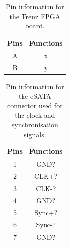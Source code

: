 \documentclass[a4paper]{article}
\begin{document}
\begin{table}[h]
    \begin{center}
        \caption{Pin information for the Trenz FPGA board.}
        \label{tab:TrenzPins}
        \begin{tabular}{cc}
            \hline
            \hline
            Pins & Functions \\
            \hline
            A & x \\
            B & y \\
            \hline
            \hline
        \end{tabular}
    \end{center}
\end{table}

\begin{table}[h]
    \begin{center}
        \caption{Pin information for the eSATA connector used for the clock and synchronisation signals.}
        \label{tab:ClockSyncPins}
        \begin{tabular}{cc}
            \hline
            \hline
            Pins & Functions \\
            \hline
            1 & GND? \\
            2 & CLK+? \\
            3 & CLK-? \\
            4 & GND? \\
            5 & Sync+? \\
            6 & Sync-? \\
            7 & GND? \\
            \hline
            \hline
        \end{tabular}
    \end{center}
\end{table}
\end{document}
